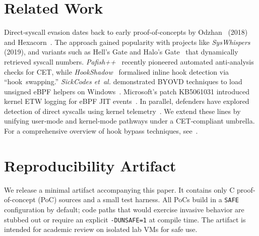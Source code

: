 \documentclass[11pt,letterpaper]{article}
\begin{document}
    \section{Related Work}
    \label{sec:related}
    Direct‑syscall evasion dates back to early proof‑of‑concepts by Odzhan~\cite{Odzhan2018} (2018) and Hexacorn~\cite{Hexacorn2017}. The approach gained popularity with projects like \emph{SysWhispers}~\cite{SysWhispers2019} (2019), and variants such as Hell’s Gate and Halo’s Gate~\cite{Trickster2021} that dynamically retrieved syscall numbers. \emph{Pafish++}~\cite{Pafish2024} recently pioneered automated anti‑analysis checks for CET, while \emph{HookShadow}~\cite{HookShadow2023} formalised inline hook detection via “hook swapping.” \emph{SickCodes et al.} demonstrated BYOVD techniques to load unsigned eBPF helpers on Windows~\cite{SickCodes2024}. Microsoft’s patch KB5061031 introduced kernel ETW logging for eBPF JIT events~\cite{MSFT2025}. In parallel, defenders have explored detection of direct syscalls using kernel telemetry~\cite{Chechik2024}. We extend these lines by unifying user‑mode and kernel‑mode pathways under a CET‑compliant umbrella. For a comprehensive overview of hook bypass techniques, see \cite{MDSec2020}.

    \section{Reproducibility Artifact}
    \label{sec:repro}
    We release a minimal artifact accompanying this paper. It contains only C proof-of-concept (PoC) sources and a small test harness. All PoCs build in a \texttt{SAFE} configuration by default; code paths that would exercise invasive behavior are stubbed out or require an explicit \texttt{-DUNSAFE=1} at compile time. The artifact is intended for academic review on isolated lab VMs for safe use.
\end{document}

